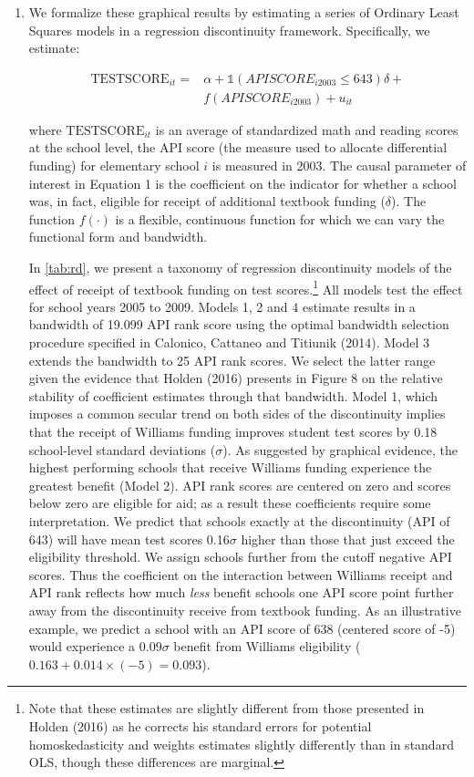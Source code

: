 \documentclass[a4paper, 11pt]{article}
\begin{document}
\begin{enumerate}
	\item[B2.] We formalize these graphical results by estimating a series of Ordinary Least Squares models in a regression discontinuity framework. Specifically, we estimate:

\begin{equation} 
\begin{aligned}
\text{TESTSCORE}_{it}= & \alpha+ \mathbb{1} \left(APISCORE_{i2003} \leq 643\right)\delta + \\
& f\left(APISCORE_{i2003}\right)+u_{it}
\label{eq:1}
\end{aligned}
\end{equation}

	where $\text{TESTSCORE}_{it}$ is an average of standardized math and reading scores at the school level, the API score (the measure used to allocate differential funding) for elementary school $i$ is measured in 2003. The causal parameter of interest in Equation 1 is the coefficient on the indicator for whether a school was, in fact, eligible for receipt of additional textbook funding ($\delta$). The function $f(\cdot)$ is a flexible, continuous function for which we can vary the functional form and bandwidth.


	In \autoref{tab:rd}, we present a taxonomy of regression discontinuity models of the effect of receipt of textbook funding on test scores.\footnote{Note that these estimates are slightly different from those presented in Holden (2016) as he corrects his standard errors for potential homoskedasticity and weights estimates slightly differently than in standard OLS, though these differences are marginal.}  All models test the effect for school years 2005 to 2009. Models 1, 2 and 4 estimate results in a bandwidth of 19.099 API rank score using the optimal bandwidth selection procedure specified in Calonico, Cattaneo and Titiunik (2014). Model 3 extends the bandwidth to 25 API rank scores. We select the latter range given the evidence that Holden (2016) presents in Figure 8 on the relative stability of coefficient estimates through that bandwidth. Model 1, which imposes a common secular trend on both sides of the discontinuity implies that the receipt of Williams funding improves student test scores by 0.18 school-level standard deviations ($\sigma$). As suggested by graphical evidence, the highest performing schools that receive Williams funding experience the greatest benefit (Model 2). API rank scores are centered on zero and scores below zero are eligible for aid; as a result these coefficients require some interpretation. We predict that schools exactly at the discontinuity (API of 643) will have mean test scores 0.16$\sigma$ higher than those that just exceed the eligibility threshold. We assign schools further from the cutoff negative API scores. Thus the coefficient on the interaction between Williams receipt and API rank reflects how much \textit{less} benefit schools one API score point further away from the discontinuity receive from textbook funding. As an illustrative example, we predict a school with an API score of 638 (centered score of -5) would experience a 0.09$\sigma$ benefit from Williams eligibility ($0.163+0.014 \times (-5)=0.093$).


\end{enumerate}
\end{document}
